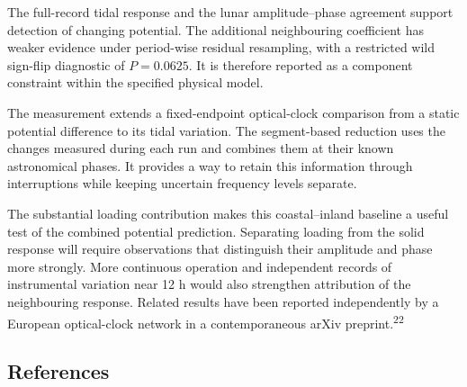 \documentclass[
  12pt,
  a4paper,
]{article}
\begin{document}
The full-record tidal response and the lunar amplitude--phase agreement
support detection of changing potential. The additional neighbouring
coefficient has weaker evidence under period-wise residual resampling,
with a restricted wild sign-flip diagnostic of \(P=0.0625\). It is
therefore reported as a component constraint within the specified
physical model.

The measurement extends a fixed-endpoint optical-clock comparison from a
static potential difference to its tidal variation. The segment-based
reduction uses the changes measured during each run and combines them at
their known astronomical phases. It provides a way to retain this
information through interruptions while keeping uncertain frequency
levels separate.

The substantial loading contribution makes this coastal--inland baseline
a useful test of the combined potential prediction. Separating loading
from the solid response will require observations that distinguish their
amplitude and phase more strongly. More continuous operation and
independent records of instrumental variation near 12 h would also
strengthen attribution of the neighbouring response. Related results
have been reported independently by a European optical-clock network in
a contemporaneous arXiv preprint.\textsuperscript{22}

\clearpage

\singlespacing\fontsize{11}{13}\selectfont

\hypertarget{references}{%
\subsection{References}\label{references}}
\end{document}
